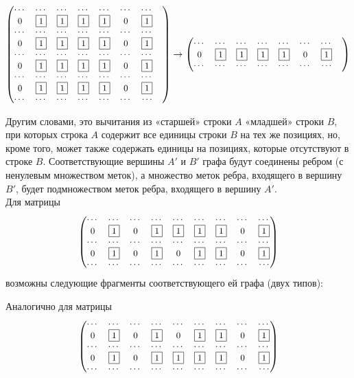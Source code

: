 \[
{\small
\begin{pmatrix}
    \cdots & \cdots & \cdots & \cdots & \cdots & \cdots & \cdots & \cr
    0 & \fbox{1} & \fbox{1} & \fbox{1} & \fbox{1} & 0 & \fbox{1} \cr
    \cdots & \cdots & \cdots & \cdots & \cdots & \cdots & \cdots & \cr
    0 & \fbox{1} & \fbox{1} & \fbox{1} & \fbox{1} & 0 & \fbox{1} \cr
    \cdots & \cdots & \cdots & \cdots & \cdots & \cdots & \cdots & \cr
    0 & \fbox{1} & \fbox{1} & \fbox{1} & \fbox{1} & 0 & \fbox{1} \cr
    \cdots & \cdots & \cdots & \cdots & \cdots & \cdots & \cdots & \cr
    0 & \fbox{1} & \fbox{1} & \fbox{1} & \fbox{1} & 0 & \fbox{1} \cr
    \cdots & \cdots & \cdots & \cdots & \cdots & \cdots & \cdots
\end{pmatrix}
\rightarrow
\begin{pmatrix}
    \cdots & \cdots & \cdots & \cdots & \cdots & \cdots & \cdots & \cr
    0 & \fbox{1} & \fbox{1} & \fbox{1} & \fbox{1} & 0 & \fbox{1} \cr
    \cdots & \cdots & \cdots & \cdots & \cdots & \cdots & \cdots
\end{pmatrix}
}
\]

Другим словами, это вычитания из «старшей» строки $A$ «младшей» стро­ки $B$, при которых строка $A$ содержит все единицы строки $B$ на тех же позициях, но, кроме того, может также содержать единицы на позициях, кото­рые отсутствуют в строке $B$. Соответствующие вершины $A'$ и $B'$ графа будут соединены ребром (с ненулевым множеством меток), а множество меток ребра, входящего в вершину $B'$, будет подмножеством меток ребра, входящего в вер­шину $A'$.
\\[24pt]
\noindent Для матрицы
\[
{\small
\begin{pmatrix}
    \cdots & \cdots & \cdots & \cdots & \cdots & \cdots & \cdots & \cdots & \cdots \cr
    0 & \fbox{1} & 0 & \fbox{1} & \fbox{1} & \fbox{1} & \fbox{1} & 0 & \fbox{1} \cr
    \cdots & \cdots & \cdots & \cdots & \cdots & \cdots & \cdots & \cdots & \cdots \cr
    0 & \fbox{1} & 0 & \fbox{1} & 0 & \fbox{1} & \fbox{1} & 0 & \fbox{1} \cr
    \cdots & \cdots & \cdots & \cdots & \cdots & \cdots & \cdots & \cdots & \cdots
\end{pmatrix}
}
\]
возможны следующие фрагменты соответствующего ей графа (двух типов):

\begin{figure}[h!]
	\noindent{}
\end{figure}

\clearpage
\noindent Аналогично для матрицы
\[
{\small
\begin{pmatrix}
    \cdots & \cdots & \cdots & \cdots & \cdots & \cdots & \cdots & \cdots & \cdots \cr
    0 & \fbox{1} & 0 & \fbox{1} & 0 & \fbox{1} & \fbox{1} & 0 & \fbox{1} \cr
    \cdots & \cdots & \cdots & \cdots & \cdots & \cdots & \cdots & \cdots & \cdots \cr
    0 & \fbox{1} & 0 & \fbox{1} & \fbox{1} & \fbox{1} & \fbox{1} & 0 & \fbox{1} \cr
    \cdots & \cdots & \cdots & \cdots & \cdots & \cdots & \cdots & \cdots & \cdots
\end{pmatrix}
}
\]

